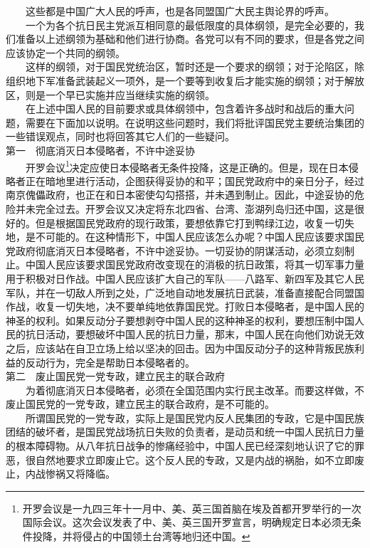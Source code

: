 \documentclass[cn,11pt,chinese]{elegantbook}
\begin{document}
　　这些都是中国广大人民的呼声，也是各同盟国广大民主舆论界的呼声。\\
　　一个为各个抗日民主党派互相同意的最低限度的具体纲领，是完全必要的，我们准备以上述纲领为基础和他们进行协商。各党可以有不同的要求，但是各党之间应该协定一个共同的纲领。\\
　　这样的纲领，对于国民党统治区，暂时还是一个要求的纲领；对于沦陷区，除组织地下军准备武装起义一项外，是一个要等到收复后才能实施的纲领；对于解放区，则是一个早已实施并应当继续实施的纲领。\\
　　在上述中国人民的目前要求或具体纲领中，包含着许多战时和战后的重大问题，需要在下面加以说明。在说明这些问题时，我们将批评国民党主要统治集团的一些错误观点，同时也将回答其它人们的一些疑问。\\
第一　彻底消灭日本侵略者，不许中途妥协\\
　　开罗会议\footnote[15]{ 开罗会议是一九四三年十一月中、美、英三国首脑在埃及首都开罗举行的一次国际会议。这次会议发表了中、美、英三国开罗宣言，明确规定日本必须无条件投降，并将侵占的中国领土台湾等地归还中国。}决定应使日本侵略者无条件投降，这是正确的。但是，现在日本侵略者正在暗地里进行活动，企图获得妥协的和平；国民党政府中的亲日分子，经过南京傀儡政府，也正在和日本密使勾勾搭搭，并未遇到制止。因此，中途妥协的危险并未完全过去。开罗会议又决定将东北四省、台湾、澎湖列岛归还中国，这是很好的。但是根据国民党政府的现行政策，要想依靠它打到鸭绿江边，收复一切失地，是不可能的。在这种情形下，中国人民应该怎么办呢？中国人民应该要求国民党政府彻底消灭日本侵略者，不许中途妥协。一切妥协的阴谋活动，必须立刻制止。中国人民应该要求国民党政府改变现在的消极的抗日政策，将其一切军事力量用于积极对日作战。中国人民应该扩大自己的军队——八路军、新四军及其它人民军队，并在一切敌人所到之处，广泛地自动地发展抗日武装，准备直接配合同盟国作战，收复一切失地，决不要单纯地依靠国民党。打败日本侵略者，是中国人民的神圣的权利。如果反动分子要想剥夺中国人民的这种神圣的权利，要想压制中国人民的抗日活动，要想破坏中国人民的抗日力量，那末，中国人民在向他们劝说无效之后，应该站在自卫立场上给以坚决的回击。因为中国反动分子的这种背叛民族利益的反动行为，完全是帮助日本侵略者的。\\
第二　废止国民党一党专政，建立民主的联合政府\\
　　为着彻底消灭日本侵略者，必须在全国范围内实行民主改革。而要这样做，不废止国民党的一党专政，建立民主的联合政府，是不可能的。\\
　　所谓国民党的一党专政，实际上是国民党内反人民集团的专政，它是中国民族团结的破坏者，是国民党战场抗日失败的负责者，是动员和统一中国人民抗日力量的根本障碍物。从八年抗日战争的惨痛经验中，中国人民已经深刻地认识了它的罪恶，很自然地要求立即废止它。这个反人民的专政，又是内战的祸胎，如不立即废止，内战惨祸又将降临。\\
\end{document}
